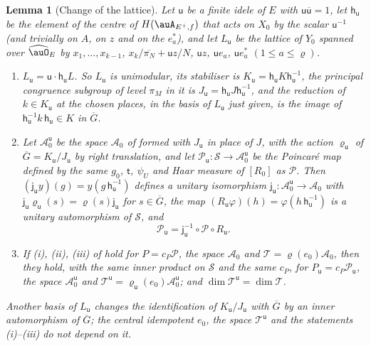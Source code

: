 \documentclass[10pt]{amsart}
\newtheorem{lemma}[theorem]{Lemma}
\theoremstyle{definition}
\theoremstyle{remark}
\providecommand{\auAz}{\mathcal A_0}
\providecommand{\auG}{\overline G}
\providecommand{\auP}{\mathcal P}
\providecommand{\auS}{\mathcal S}
\providecommand{\auT}{\mathcal T}
\providecommand{\aubar}[1]{\overline{#1}}
\begin{document}
\begin{lemma}[Change of the lattice]\label{pb:lattice}
Let $\mathsf u$ be a finite idele of $E$ with $\mathsf u\aubar{\mathsf u}=1$, let $\mathsf h_{\mathsf u}$
be the element of the centre of $H(\auA_{E^+,f})$ that acts on $X_0$ by the scalar $\mathsf u^{-1}$
(and trivially on $A$, on $z$ and on the $e_a^*$), and let $L_{\mathsf u}$ be the lattice of $Y_0$
spanned over $\widehat\auO_E$ by $x_1,\dots,x_{k-1}$, $x_k/\aubar{\pi_N}+\mathsf uz/N$, $\mathsf uz$,
$\mathsf ue_a$, $\mathsf ue_a^*$ $(1\le a\le\varrho)$.
\begin{enumerate}
\item[(a)] $L_{\mathsf u}=\mathsf u\cdot\mathsf h_{\mathsf u}L$. So $L_{\mathsf u}$ is unimodular, its
stabiliser is $K_{\mathsf u}=\mathsf h_{\mathsf u}K\mathsf h_{\mathsf u}^{-1}$, the principal congruence
subgroup of level $\pi_M$ in it is $J_{\mathsf u}=\mathsf h_{\mathsf u}J\mathsf h_{\mathsf u}^{-1}$, and
the reduction of $k\in K_{\mathsf u}$ at the chosen places, in the basis of $L_{\mathsf u}$ just given, is
the image of $\mathsf h_{\mathsf u}^{-1}k\,\mathsf h_{\mathsf u}\in K$ in $\auG$.
\item[(b)] Let $\auAz^{\mathsf u}$ be the space $\auAz$ of {\cite[\S14.3]{P46}} formed with
$J_{\mathsf u}$ in place of $J$, with the action $\varrho_{\mathsf u}$ of $\auG=K_{\mathsf u}/J_{\mathsf u}$
by right translation, and let $\auP_{\mathsf u}\colon\auS\to\auAz^{\mathsf u}$ be the Poincar\'e map
defined by the same $g_0$, $\mathsf t$, $\psi_U$ and Haar measure of $[R_0]$ as $\auP$. Then
$(\mathsf j_{\mathsf u}y)(g)=y(g\,\mathsf h_{\mathsf u}^{-1})$ defines a unitary isomorphism
$\mathsf j_{\mathsf u}\colon\auAz^{\mathsf u}\to\auAz$ with $\mathsf j_{\mathsf u}\varrho_{\mathsf u}(s)=
\varrho(s)\mathsf j_{\mathsf u}$ for $s\in\auG$, the map $(R_{\mathsf u}\varphi)(h)=\varphi(h\,\mathsf
h_{\mathsf u}^{-1})$ is a unitary automorphism of $\auS$, and
\[
\auP_{\mathsf u}=\mathsf j_{\mathsf u}^{-1}\circ\auP\circ R_{\mathsf u} .
\]
\item[(c)] If {\rm(i)}, {\rm(ii)}, {\rm(iii)} of {\cite[Proposition~14.32]{P46}} hold for $P=c_P\auP$,
the space $\auAz$ and $\auT=\varrho(e_0)\auAz$, then they hold, with the same inner product on $\auS$
and the same $c_P$, for $P_{\mathsf u}=c_P\auP_{\mathsf u}$, the space $\auAz^{\mathsf u}$ and
$\auT^{\mathsf u}=\varrho_{\mathsf u}(e_0)\auAz^{\mathsf u}$; and $\dim\auT^{\mathsf u}=\dim\auT$.
\end{enumerate}
Another basis of $L_{\mathsf u}$ changes the identification of $K_{\mathsf u}/J_{\mathsf u}$ with $\auG$ by
an inner automorphism of $\auG$; the central idempotent $e_0$, the space $\auT^{\mathsf u}$ and the
statements {\rm(i)--(iii)} do not depend on it.
\end{lemma}
\end{document}
